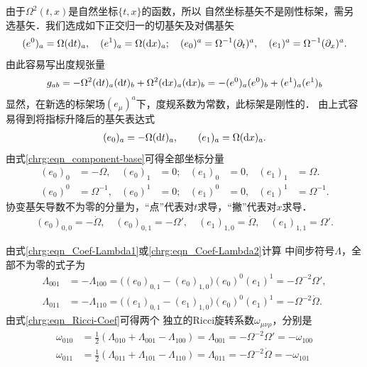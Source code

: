 \noindent {}
由于$\Omega^{2}(t,x)$是自然坐标$\{t,x\}$的函数，所以
自然坐标基矢不是刚性标架，需另选基矢．我们选成如下正交归一的切基矢及对偶基矢
\begin{align*}
(e^0)_{a}  = \Omega ({\rm d}t)_{a}, \quad    (e^1)_{a}  = \Omega ({\rm d}x)_{a};    \quad
(e_0)^{a}  = \Omega^{-1} (\partial_t)^{a}, \quad (e_1)^{a}  = \Omega^{-1}(\partial_x)^{a}.
\end{align*}
由此容易写出度规张量
\begin{align*}
g_{ab}  =  - \Omega^2 ({\rm d}t)_{a} ({\rm d}t)_{b}
+ \Omega^{2} ({\rm d}x)_{a} ({\rm d}x)_{b}
=    - (e^0)_{a}(e^0)_{b} + (e^1)_{a}(e^1)_{b}
\end{align*}
显然，在新选的标架场$(e_\mu)^a$下，度规系数为常数，此标架是刚性的．
由上式容易得到将指标升降后的基矢表达式
\begin{align*}
(e_0)_{a} =  -\Omega ({\rm d}t)_{a}, \qquad
(e_1)_{a} =  \Omega ({\rm d}x)_{a}.
\end{align*}
由式\eqref{chrg:eqn_component-base}可得全部坐标分量
\begin{align*}
(e_0)_{0} &= -\Omega, &(e_0)_{1} &= 0; & (e_1)_{0} &=0, & (e_1)_{1} &= \Omega.   \\
(e_0)^{0} &= \Omega^{-1}, &(e_0)^{1} &= 0; &(e_1)^{0} &=0,  & (e_1)^{1} &= \Omega^{-1}.
\end{align*}
协变基矢导数不为零的分量为，“点”代表对$t$求导，“撇”代表对$x$求导．
\begin{align*}
(e_0)_{0,0} = -\dot{\Omega}, \quad (e_0)_{0,1} = -\Omega' , \quad
(e_1)_{1,0} = \dot{\Omega}, \quad (e_1)_{1,1} = \Omega' .
\end{align*}


\noindent {}
由式\eqref{chrg:eqn_Coef-Lambda1}或\eqref{chrg:eqn_Coef-Lambda2}计算
中间步符号$\Lambda$，全部不为零的式子为
\begin{align*}
\Lambda_{001 } &= -\Lambda_{100}
= \bigl( (e_0)_{0,1}-(e_0)_{1,0} \bigr) (e_0)^{0} (e_1)^{1}
=  -\Omega^{-2} \Omega' , \\
\Lambda_{011 } &= -\Lambda_{110}
= \bigl( (e_1)_{0,1}-(e_1)_{1,0} \bigr) (e_0)^{0} (e_1)^{1}
=  -\Omega^{-2} \dot{\Omega} .
\end{align*}
由式\eqref{chrg:eqn_Ricci-Coef}可得两个
独立的Ricci旋转系数$\omega_{\mu\nu\rho}$，分别是
\begin{align*}
\omega_{010} &= \frac{1}{2}\left(\Lambda_{010} + \Lambda_{001} - \Lambda_{100} \right)
= \Lambda_{001} = -\Omega^{-2} \Omega' = -\omega_{100} \\
\omega_{011} &= \frac{1}{2}\left(\Lambda_{011} + \Lambda_{101} - \Lambda_{110} \right)
= \Lambda_{011} = -\Omega^{-2} \dot{\Omega}  = -\omega_{101}
\end{align*}

